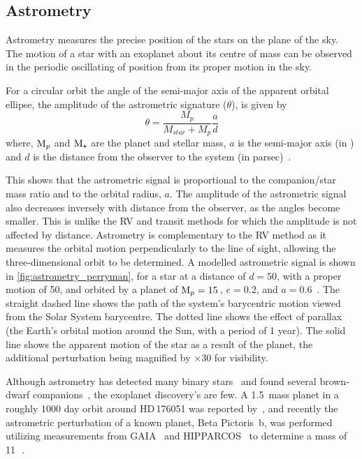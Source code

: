 \subsection{Astrometry}
\label{subsec:astrometry}
Astrometry measures the precise position of the stars on the plane of the sky.
The motion of a star with an exoplanet about its centre of mass can be observed in the periodic oscillating of position from its proper motion in the sky.

For a circular orbit the angle of the semi-major axis of the apparent orbital ellipse, the amplitude of the astrometric signature ($\theta$), is given by
\begin{equation}
\theta = \frac{M_{p}}{M_{star} + M_{p}} \frac{a}{d}
\end{equation}
where, \(\textrm{M}_{p}\) and $\textrm{M}_{\star}$ are the planet and stellar mass, \(a\) is the semi-major axis (in \AU) and \(d\) is the distance from the observer to the system (in parsec)~\citep{perryman_exoplanet_2011}.

This shows that the astrometric signal is proportional to the companion/star mass ratio and to the orbital radius, \(a\).
The amplitude of the astrometric signal also decreases inversely with distance from the observer, as the angles become smaller.
This is unlike the {RV} and transit methods for which the amplitude is not affected by distance.
Astrometry is complementary to the {RV} method as it measures the orbital motion perpendicularly to the line of sight, allowing the three-dimensional orbit to be determined.
A modelled astrometric signal is shown in \cref{fig:astrometry_perryman}, for a star at a distance of $d=50$\pc, with a proper motion of 50\masperyr{}, and orbited by a planet of $\textrm{M}_{p}=15$\,\Mjup{}, $e=0.2$, and $a=0.6$\AU~\citep{perryman_extrasolar_2000}.
The straight dashed line shows the path of the system's barycentric motion viewed from the Solar System barycentre.
The dotted line shows the effect of parallax (the Earth's orbital motion around the Sun, with a period of 1 year).
The solid line shows the apparent motion of the star as a result of the planet, the additional perturbation being magnified by $\times 30$ for visibility.

Although astrometry has detected many binary stars~\citep[e.g.][]{gontcharov_new_2000} and found several brown-dwarf companions~\citep[e.g.][]{sahlmann_search_2011}, the exoplanet discovery's are few.
A 1.5\,\Mjup{} mass planet in a roughly 1000 day orbit around {HD\,176051} was reported by~\citet{muterspaugh_phases_2010}, and recently the astrometric perturbation of a known planet, {Beta Pictoris~b}, was performed utilizing measurements from {GAIA}~\citep{gaiacollaboration_gaia_2016} and {HIPPARCOS}~\citep{esa_hipparcos_1997} to determine a mass of 11\,\Mjup~\citep{snellen_mass_2018}.


